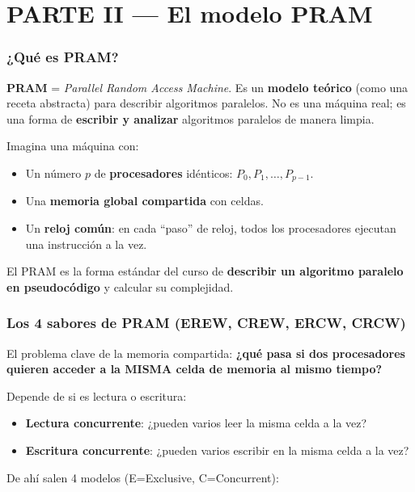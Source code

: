 \documentclass[11pt,a4paper]{article}
\newcommand{\term}[1]{\textbf{\textcolor{clave}{#1}}}
\begin{document}
\part*{PARTE II --- El modelo PRAM}

\section{¿Qué es PRAM?}

\term{PRAM} = \emph{Parallel Random Access Machine}. Es un \textbf{modelo
teórico} (como una receta abstracta) para describir algoritmos paralelos. No es
una máquina real; es una forma de \textbf{escribir y analizar} algoritmos
paralelos de manera limpia.

Imagina una máquina con:
\begin{itemize}
  \item Un número $p$ de \textbf{procesadores} idénticos: $P_0, P_1, \ldots,
        P_{p-1}$.
  \item Una \textbf{memoria global compartida} con celdas.
  \item Un \textbf{reloj común}: en cada ``paso'' de reloj, todos los
        procesadores ejecutan una instrucción a la vez.
\end{itemize}

El PRAM es la forma estándar del curso de \textbf{describir un algoritmo
paralelo en pseudocódigo} y calcular su complejidad.

\section{Los 4 sabores de PRAM (EREW, CREW, ERCW, CRCW)}

El problema clave de la memoria compartida: \textbf{¿qué pasa si dos
procesadores quieren acceder a la MISMA celda de memoria al mismo tiempo?}

Depende de si es lectura o escritura:
\begin{itemize}
  \item \textbf{Lectura concurrente}: ¿pueden varios leer la misma celda a la vez?
  \item \textbf{Escritura concurrente}: ¿pueden varios escribir en la misma celda a la vez?
\end{itemize}

De ahí salen 4 modelos (E=Exclusive, C=Concurrent):
\end{document}
